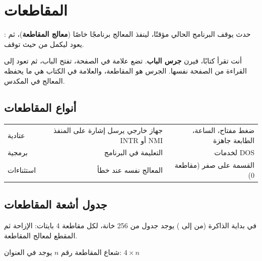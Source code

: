 \section{المقاطعات}

\begin{tarif}
    : حدث يوقف البرنامج الحالي مؤقتًا، لينفذ المعالج
    برنامجًا خاصًا (\textbf{معالج المقاطعة})، ثم يعود ليكمل من حيث توقف.
\end{tarif}

\begin{tashbih}
    أنت تقرأ كتابًا، فيرن \textbf{جرس الباب}. تضع علامة في الصفحة، تفتح الباب، ثم تعود إلى القراءة
    من الصفحة نفسها. الجرس هو المقاطعة، والعلامة في الكتاب هي ما يحفظه المعالج في المكدس.
\end{tashbih}

\subsection{أنواع المقاطعات}
\begin{center}
\small
\begin{tabularx}{\linewidth}{|>{\centering\arraybackslash}p{3cm}|R|R|}
    \hline
     &  &  \\ \hline
    عتادية & جهاز خارجي يرسل إشارة على المنفذ \textenglish{INTR} أو \textenglish{NMI} & ضغط مفتاح، الساعة، الطابعة جاهزة \\ \hline
    برمجية & التعليمة  في البرنامج &  لخدمات \textenglish{DOS} \\ \hline
    استثناءات & المعالج نفسه عند خطأ & القسمة على صفر (مقاطعة 0) \\ \hline
\end{tabularx}
\end{center}

\subsection{جدول أشعة المقاطعات}
في بداية الذاكرة (من  إلى ) يوجد جدول من 256 خانة، لكل مقاطعة 4 بايتات:
الإزاحة ثم المقطع لمعالج المقاطعة.

\begin{tarif}
    \centering
    شعاع المقاطعة رقم $n$ يوجد في العنوان: \quad $4 \times n$
\end{tarif}

